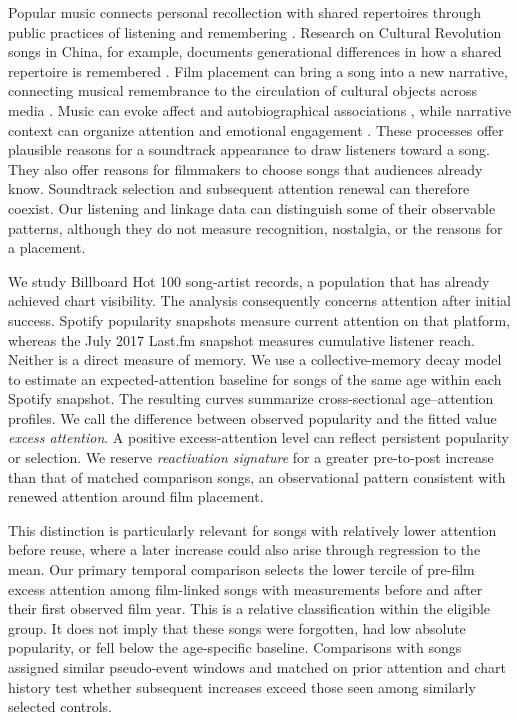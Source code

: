 \documentclass[10pt]{article}
\begin{document}
Popular music connects personal recollection with shared repertoires through public practices of listening and remembering \citep{van2006record}. Research on Cultural Revolution songs in China, for example, documents generational differences in how a shared repertoire is remembered \citep{bryant2005music}. Film placement can bring a song into a new narrative, connecting musical remembrance to the circulation of cultural objects across media \citep{JenkinsDeuze2008,bolter1996remediation,erll2016travelling}. Music can evoke affect and autobiographical associations \citep{janata2007characterisation,krumhansl2013cascading}, while narrative context can organize attention and emotional engagement \citep{Green2004,BezdekGerrig2017}. These processes offer plausible reasons for a soundtrack appearance to draw listeners toward a song. They also offer reasons for filmmakers to choose songs that audiences already know. Soundtrack selection and subsequent attention renewal can therefore coexist. Our listening and linkage data can distinguish some of their observable patterns, although they do not measure recognition, nostalgia, or the reasons for a placement.

We study Billboard Hot 100 song-artist records, a population that has already achieved chart visibility. The analysis consequently concerns attention after initial success. Spotify popularity snapshots measure current attention on that platform, whereas the July 2017 Last.fm snapshot measures cumulative listener reach. Neither is a direct measure of memory. We use a collective-memory decay model to estimate an expected-attention baseline for songs of the same age within each Spotify snapshot. The resulting curves summarize cross-sectional age--attention profiles. We call the difference between observed popularity and the fitted value \emph{excess attention}. A positive excess-attention level can reflect persistent popularity or selection. We reserve \emph{reactivation signature} for a greater pre-to-post increase than that of matched comparison songs, an observational pattern consistent with renewed attention around film placement.

This distinction is particularly relevant for songs with relatively lower attention before reuse, where a later increase could also arise through regression to the mean. Our primary temporal comparison selects the lower tercile of pre-film excess attention among film-linked songs with measurements before and after their first observed film year. This is a relative classification within the eligible group. It does not imply that these songs were forgotten, had low absolute popularity, or fell below the age-specific baseline. Comparisons with songs assigned similar pseudo-event windows and matched on prior attention and chart history test whether subsequent increases exceed those seen among similarly selected controls.
\end{document}
